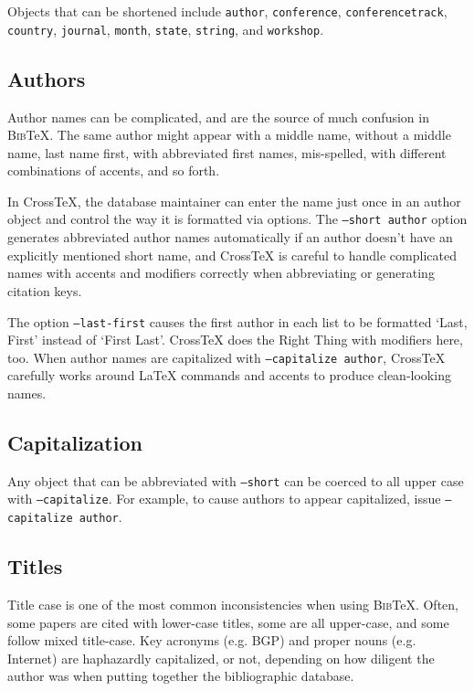 \documentclass{article}
\newcommand{\XTX}{Cross\TeX}
\newcommand{\BibTeX}{\textsc{Bib}\TeX}
\begin{document}
Objects that can be shortened include \texttt{author},
\texttt{conference}, \texttt{conferencetrack}, \texttt{country},
\texttt{journal}, \texttt{month}, \texttt{state}, \texttt{string},
and \texttt{workshop}.

\subsection{Authors}

Author names can be complicated, and are the source of much confusion
in \BibTeX{}. The same author might appear with a middle name, without a
middle name, last name first, with abbreviated first names, mis-spelled,
with different combinations of accents, and so forth.

In \XTX{}, the database maintainer can enter the name just once in an
author object and control the way it is formatted via options. The
\texttt{--short author} option generates abbreviated author names
automatically if an author doesn't have an explicitly mentioned short
name, and \XTX{} is careful to handle complicated names with accents
and modifiers correctly when abbreviating or generating citation keys.

The option \texttt{--last-first} causes the first author in each list
to be formatted `Last, First' instead of `First Last'.  \XTX{} does the
Right Thing with modifiers here, too.  When author names are capitalized
with \texttt{--capitalize author}, \XTX{} carefully works around \LaTeX{}
commands and accents to produce clean-looking names.

\subsection{Capitalization}

Any object that can be abbreviated with \texttt{--short} can be coerced to
all upper case with \texttt{--capitalize}.  For example, to cause authors
to appear capitalized, issue \texttt{--capitalize author}.

\subsection{Titles}

Title case is one of the most common inconsistencies when using
\BibTeX{}. Often, some papers are cited with lower-case titles, some are all
upper-case, and some follow mixed title-case. Key acronyms (e.g. BGP)
and proper nouns (e.g. Internet) are haphazardly capitalized, or not,
depending on how diligent the author was when putting together the
bibliographic database.
\end{document}
